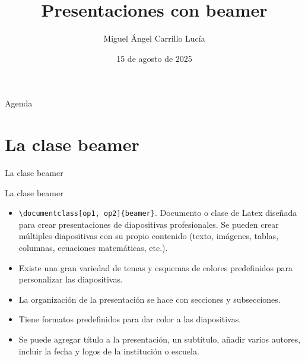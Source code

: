 \documentclass[aspectratio=169, 10pt]{beamer}
\title[\hspace{25mm} \insertframenumber/\inserttotalframenumber]{\bf Presentaciones con beamer}
\author[Taller de Herramientas Computacionales - 2024-1] %
{\hspace{2.70mm} \large{Miguel Ángel Carrillo Lucía} } %
\institute[] %
{
    Universidad Nacional Autónoma de México\\
    Facultad de Ciencias\\
    Departamento de Matemáticas\\
    Lic. en Matemáticas Aplicadas
}
\date{15 de agosto de 2025}
\begin{document}

\begin{frame}
    \titlepage
\end{frame}

\begin{frame}{Agenda}
     \tableofcontents[sectionstyle=show,subsectionstyle=show/shaded/hide,subsubsectionstyle=show/shaded/hide]
\end{frame}



\section{La clase beamer}
\begin{frame}[fragile]{La clase beamer}
 \justifying
            \begin{block}{La clase beamer}
            \begin{itemize} \pause
            \justifying
                \item \verb|\documentclass[op1, op2]{beamer}|. Documento o clase de Latex diseñada para crear presentaciones de diapositivas profesionales. Se pueden crear múltiples diapositivas con su propio contenido (texto, imágenes, tablas, columnas, ecuaciones matemáticas, etc.). \pause
                \item Existe una gran variedad de temas y esquemas de colores predefinidos para personalizar las diapositivas. \pause
                \item La organización de la presentación se hace con secciones y subsecciones. \pause 
                \item Tiene formatos predefinidos para dar color a las diapositivas. \pause
                \item Se puede agregar título a la presentación, un subtítulo, añadir varios autores, incluir la fecha y logos de la institución o escuela.
            \end{itemize}
            \end{block} 

\end{frame}
\end{document}
